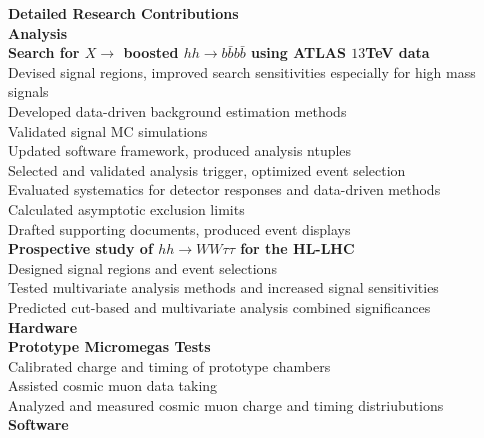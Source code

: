 \documentclass[letterpaper,11pt,oneside]{article}
\begin{document}
\newpage
\raggedright
\normalsize
\textbf{\Large{Detailed Research Contributions}} \\
\vspace{0.4cm}
 \textbf{Analysis}\\
	\vspace{0.1cm}
 	\quad \textbf{Search for $X \to$ boosted $ hh \to b\bar{b}b\bar{b}$ using ATLAS $13$TeV data}\\
	\quad \quad Devised signal regions, improved search sensitivities especially for high mass signals \\
	\quad \quad Developed data-driven background estimation methods \\
	\quad \quad Validated signal MC simulations \\
	\quad \quad Updated software framework, produced analysis ntuples \\
	\quad \quad Selected and validated analysis trigger, optimized event selection \\
	\quad \quad Evaluated systematics for detector responses and data-driven methods \\
	\quad \quad Calculated asymptotic exclusion limits \\
	\quad \quad Drafted supporting documents, produced event displays \\
	\vspace{0.1cm}
 	\quad \textbf{Prospective study of $hh \to WW\tau\tau$ for the HL-LHC}\\
	\quad \quad  Designed signal regions and event selections\\
	\quad \quad  Tested multivariate analysis methods and increased signal sensitivities \\
	\quad \quad  Predicted cut-based and multivariate analysis combined significances \\
	\vspace{0.4cm}
 \textbf{Hardware}\\
	\vspace{0.1cm}
 	\quad \textbf{Prototype Micromegas Tests}\\
	\quad \quad Calibrated charge and timing of prototype chambers \\
	\quad \quad Assisted cosmic muon data taking \\
	\quad \quad Analyzed and measured cosmic muon charge and timing distriubutions \\
	\vspace{0.4cm}
 \textbf{Software}\\
	\vspace{0.1cm}
\end{document}
